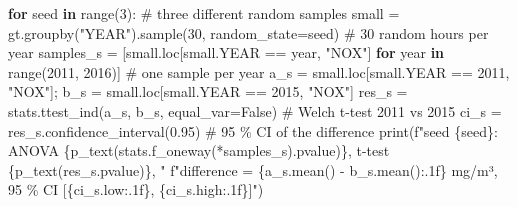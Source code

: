 \documentclass[
  letterpaper,
  DIV=11,
  numbers=noendperiod]{scrreprt}
\newenvironment{Shaded}{\begin{snugshade}}{\end{snugshade}}
\newcommand{\BuiltInTok}[1]{\textcolor[rgb]{0.00,0.23,0.31}{#1}}
\newcommand{\CommentTok}[1]{\textcolor[rgb]{0.37,0.37,0.37}{#1}}
\newcommand{\ControlFlowTok}[1]{\textcolor[rgb]{0.00,0.23,0.31}{\textbf{#1}}}
\newcommand{\DecValTok}[1]{\textcolor[rgb]{0.68,0.00,0.00}{#1}}
\newcommand{\FloatTok}[1]{\textcolor[rgb]{0.68,0.00,0.00}{#1}}
\newcommand{\KeywordTok}[1]{\textcolor[rgb]{0.00,0.23,0.31}{\textbf{#1}}}
\newcommand{\NormalTok}[1]{\textcolor[rgb]{0.00,0.23,0.31}{#1}}
\newcommand{\OperatorTok}[1]{\textcolor[rgb]{0.37,0.37,0.37}{#1}}
\newcommand{\SpecialCharTok}[1]{\textcolor[rgb]{0.37,0.37,0.37}{#1}}
\newcommand{\SpecialStringTok}[1]{\textcolor[rgb]{0.13,0.47,0.30}{#1}}
\newcommand{\StringTok}[1]{\textcolor[rgb]{0.13,0.47,0.30}{#1}}
\newcommand{\VariableTok}[1]{\textcolor[rgb]{0.07,0.07,0.07}{#1}}
\begin{document}
\begin{tcolorbox}[enhanced jigsaw, left=2mm, title=\textcolor{quarto-callout-caution-color}{\faFire}\hspace{0.5em}{Solution to Exercise 2}, opacityback=0, breakable, rightrule=.15mm, arc=.35mm, toptitle=1mm, colbacktitle=quarto-callout-caution-color!10!white, opacitybacktitle=0.6, coltitle=black, colframe=quarto-callout-caution-color-frame, bottomrule=.15mm, leftrule=.75mm, bottomtitle=1mm, titlerule=0mm, toprule=.15mm, colback=white]

\begin{Shaded}
\begin{Highlighting}[]
\ControlFlowTok{for}\NormalTok{ seed }\KeywordTok{in} \BuiltInTok{range}\NormalTok{(}\DecValTok{3}\NormalTok{):                                        }\CommentTok{\# three different random samples}
\NormalTok{    small }\OperatorTok{=}\NormalTok{ gt.groupby(}\StringTok{"YEAR"}\NormalTok{).sample(}\DecValTok{30}\NormalTok{, random\_state}\OperatorTok{=}\NormalTok{seed)       }\CommentTok{\# 30 random hours per year}
\NormalTok{    samples\_s }\OperatorTok{=}\NormalTok{ [small.loc[small.YEAR }\OperatorTok{==}\NormalTok{ year, }\StringTok{"NOX"}\NormalTok{] }\ControlFlowTok{for}\NormalTok{ year }\KeywordTok{in} \BuiltInTok{range}\NormalTok{(}\DecValTok{2011}\NormalTok{, }\DecValTok{2016}\NormalTok{)]  }\CommentTok{\# one sample per year}
\NormalTok{    a\_s }\OperatorTok{=}\NormalTok{ small.loc[small.YEAR }\OperatorTok{==} \DecValTok{2011}\NormalTok{, }\StringTok{"NOX"}\NormalTok{]}\OperatorTok{;}\NormalTok{ b\_s }\OperatorTok{=}\NormalTok{ small.loc[small.YEAR }\OperatorTok{==} \DecValTok{2015}\NormalTok{, }\StringTok{"NOX"}\NormalTok{]}
\NormalTok{    res\_s }\OperatorTok{=}\NormalTok{ stats.ttest\_ind(a\_s, b\_s, equal\_var}\OperatorTok{=}\VariableTok{False}\NormalTok{)       }\CommentTok{\# Welch t{-}test 2011 vs 2015}
\NormalTok{    ci\_s }\OperatorTok{=}\NormalTok{ res\_s.confidence\_interval(}\FloatTok{0.95}\NormalTok{)                    }\CommentTok{\# 95 \% CI of the difference}
    \BuiltInTok{print}\NormalTok{(}\SpecialStringTok{f"seed }\SpecialCharTok{\{}\NormalTok{seed}\SpecialCharTok{\}}\SpecialStringTok{: ANOVA }\SpecialCharTok{\{}\NormalTok{p\_text(stats.f\_oneway(}\OperatorTok{*}\NormalTok{samples\_s).pvalue)}\SpecialCharTok{\}}\SpecialStringTok{, t{-}test }\SpecialCharTok{\{}\NormalTok{p\_text(res\_s.pvalue)}\SpecialCharTok{\}}\SpecialStringTok{, "}
          \SpecialStringTok{f"difference = }\SpecialCharTok{\{}\NormalTok{a\_s}\SpecialCharTok{.}\NormalTok{mean() }\OperatorTok{{-}}\NormalTok{ b\_s}\SpecialCharTok{.}\NormalTok{mean()}\SpecialCharTok{:.1f\}}\SpecialStringTok{ mg/m³, 95 \% CI [}\SpecialCharTok{\{}\NormalTok{ci\_s}\SpecialCharTok{.}\NormalTok{low}\SpecialCharTok{:.1f\}}\SpecialStringTok{, }\SpecialCharTok{\{}\NormalTok{ci\_s}\SpecialCharTok{.}\NormalTok{high}\SpecialCharTok{:.1f\}}\SpecialStringTok{]"}\NormalTok{)}
\end{Highlighting}
\end{Shaded}


\end{tcolorbox}
\end{document}

